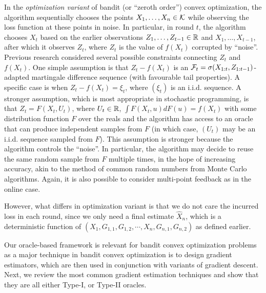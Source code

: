 In the \emph{optimization variant} of bandit (or ``zeroth order'') convex optimization, 
the algorithm sequentially chooses the points $X_1,\dots,X_n\in \mathcal{K}$ while observing the loss function at these points in noise.
In particular, in round $t$, the algorithm chooses $X_t$ based on the earlier observations $Z_1,\dots,Z_{t-1}\in \mathbb{R}$ and $X_1,\dots,X_{t-1}$, after which it observes $Z_t$, where $Z_t$ is the value of $f(X_t)$ corrupted by ``noise''.
Previous research considered several possible constraints connecting $Z_t$ and $f(X_t)$.
One simple assumption is that $Z_t-f(X_t)$ is an $\mathcal{F}_t = \sigma(X_{1:t},Z_{1:t-1})$-adapted martingale difference sequence (with favourable tail properties). 
A specific case is when $Z_t - f(X_t) = \xi_t$, where $(\xi_t)$ is an i.i.d. sequence.
A stronger assumption, which is most appropriate in stochastic programming, 
is that $Z_t = F(X_t,U_t)$, where $U_t\in \mathbb{R}$, $\int F(X_t,u) dF(u) = f(X_t)$ with some distribution function $F$ over the reals and the algorithm has access to an oracle that can produce independent samples from $F$ (in which case, $(U_t)$ may be an i.i.d. sequence sampled from $F$).
This assumption is stronger because the algorithm controls the ``noise''. 
In particular, the algorithm may decide to reuse the same random sample from $F$ multiple times, 
in the hope of increasing accuracy, akin to the method of common random numbers from Monte Carlo algorithms.
Again, it is also possible to consider multi-point feedback as in the online case.

However, what differs in optimization variant is that we do not care the incurred loss in each round, since we only need a final estimate $\hat{X}_n$, which is a deterministic function of $\left( X_1, G_{1,1}, G_{1,2}, \cdots, X_{n},G_{n,1}, G_{n,2}  \right)$ as defined earlier.


Our oracle-based framework is relevant for bandit convex optimization problems as a major technique in bandit convex
optimization is to design gradient estimators, which are then used in conjunction with variants of gradient descent. 
Next, we review the most common gradient estimation techniques and show that they are all either Type-I, or Type-II oracles.

